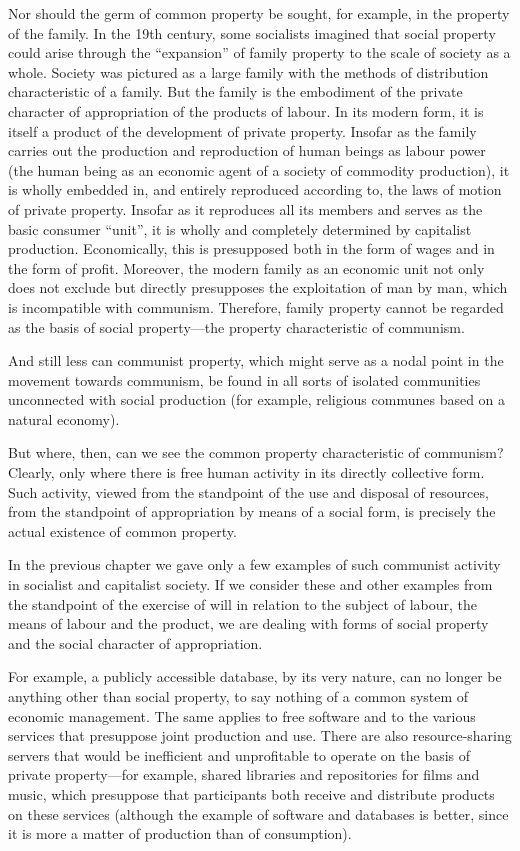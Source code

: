 \documentclass[../main]{subfiles}
\begin{document}
Nor should the germ of common property be sought, for example, in the property of the family. In the 19th century, some socialists imagined that social property could arise through the “expansion” of family property to the scale of society as a whole. Society was pictured as a large family with the methods of distribution characteristic of a family. But the family is the embodiment of the private character of appropriation of the products of labour. In its modern form, it is itself a product of the development of private property. Insofar as the family carries out the production and reproduction of human beings as labour power (the human being as an economic agent of a society of commodity production), it is wholly embedded in, and entirely reproduced according to, the laws of motion of private property. Insofar as it reproduces all its members and serves as the basic consumer “unit”, it is wholly and completely determined by capitalist production. Economically, this is presupposed both in the form of wages and in the form of profit. Moreover, the modern family as an economic unit not only does not exclude but directly presupposes the exploitation of man by man, which is incompatible with communism. Therefore, family property cannot be regarded as the basis of social property—the property characteristic of communism.

And still less can communist property, which might serve as a nodal point in the movement towards communism, be found in all sorts of isolated communities unconnected with social production (for example, religious communes based on a natural economy).

But where, then, can we see the common property characteristic of communism? Clearly, only where there is free human activity in its directly collective form. Such activity, viewed from the standpoint of the use and disposal of resources, from the standpoint of appropriation by means of a social form, is precisely the actual existence of common property.

In the previous chapter we gave only a few examples of such communist activity in socialist and capitalist society. If we consider these and other examples from the standpoint of the exercise of will in relation to the subject of labour, the means of labour and the product, we are dealing with forms of social property and the social character of appropriation.

For example, a publicly accessible database, by its very nature, can no longer be anything other than social property, to say nothing of a common system of economic management. The same applies to free software and to the various services that presuppose joint production and use. There are also resource-sharing servers that would be inefficient and unprofitable to operate on the basis of private property—for example, shared libraries and repositories for films and music, which presuppose that participants both receive and distribute products on these services (although the example of software and databases is better, since it is more a matter of production than of consumption).
\end{document}

